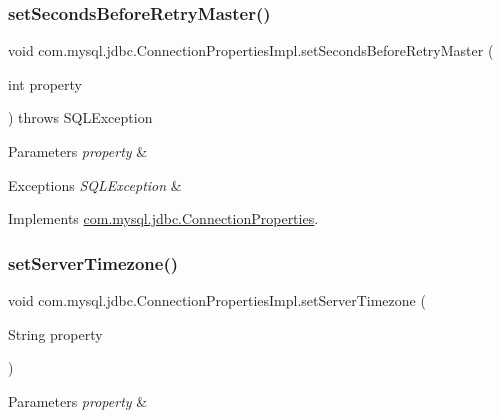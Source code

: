 \subsubsection{\texorpdfstring{set\+Seconds\+Before\+Retry\+Master()}{setSecondsBeforeRetryMaster()}}
{\footnotesize\ttfamily void com.\+mysql.\+jdbc.\+Connection\+Properties\+Impl.\+set\+Seconds\+Before\+Retry\+Master (\begin{DoxyParamCaption}\item[{int}]{property }\end{DoxyParamCaption}) throws S\+Q\+L\+Exception}


\begin{DoxyParams}{Parameters}
{\em property} & \\
\hline
\end{DoxyParams}

\begin{DoxyExceptions}{Exceptions}
{\em S\+Q\+L\+Exception} & \\
\hline
\end{DoxyExceptions}


Implements \mbox{\hyperlink{interfacecom_1_1mysql_1_1jdbc_1_1_connection_properties_aebbbaaab658a9df1fd2af21e9c3ccbf5}{com.\+mysql.\+jdbc.\+Connection\+Properties}}.

\mbox{\label{classcom_1_1mysql_1_1jdbc_1_1_connection_properties_impl_a41603562941daa36f6b6616896698088}} 
\subsubsection{\texorpdfstring{set\+Server\+Timezone()}{setServerTimezone()}}
{\footnotesize\ttfamily void com.\+mysql.\+jdbc.\+Connection\+Properties\+Impl.\+set\+Server\+Timezone (\begin{DoxyParamCaption}\item[{String}]{property }\end{DoxyParamCaption})}


\begin{DoxyParams}{Parameters}
{\em property} & \\
\hline
\end{DoxyParams}


